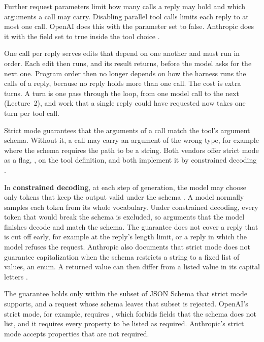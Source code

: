 Further request parameters limit how many calls a reply may hold and which arguments a call may
carry. Disabling parallel tool calls limits each reply to at most one call. OpenAI does this with the
parameter  set to false. Anthropic does it with the field
 set to true inside the tool choice \citep{anthropic-tooluse}.

One call per reply serves edits that depend on one another and must run in order. Each edit then
runs, and its result returns, before the model asks for the next one. Program order then no longer
depends on how the harness runs the calls of a reply, because no reply holds more than one call.
The cost is extra turns. A turn is one pass through the loop, from one model call to the next
(Lecture~2), and work that a single reply could have requested now takes one turn per tool call.

Strict mode guarantees that the arguments of a call match the tool's argument schema. Without it, a
call may carry an argument of the wrong type, for example  where the
schema requires the path to be a string. Both vendors offer strict mode as a flag,
, on the tool definition, and both implement it by constrained decoding
\citep{openai-function-calling,anthropic-strict-tool-use}.

In \textbf{constrained decoding}, at each step of generation, the model may choose only tokens that
keep the output valid under the schema \citep{openai2024structuredoutputs}. A model normally samples
each token from its whole vocabulary. Under constrained decoding, every token that would break the
schema is excluded, so arguments that the model finishes decode and match the schema. The
guarantee does not cover a reply that is cut off early, for example at the reply's length limit, or
a reply in which the model refuses the request. Anthropic also documents that strict mode does not
guarantee capitalization when the schema restricts a string to a fixed list of values, an enum. A
returned value can then differ from a listed value in its capital letters
\citep{anthropic-structured-outputs}.

The guarantee holds only within the subset of JSON Schema that strict mode supports, and a request
whose schema leaves that subset is rejected. OpenAI's strict mode, for example, requires
, which forbids fields that the schema does not list, and it
requires every property to be listed as required. Anthropic's strict mode accepts properties that
are not required.

